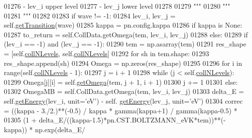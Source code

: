 \begin{DoxyCode}
{{01276 \textcolor{stringliteral}{            - lev\_i  upper level}
01277 \textcolor{stringliteral}{            - lev\_j  lower level}
01278 \textcolor{stringliteral}{}
01279 \textcolor{stringliteral}{        """}
01280         \textcolor{stringliteral}{"""}
01281 \textcolor{stringliteral}{        """}
01282         
01283         \textcolor{keywordflow}{if} wave != -1:
01284             lev\_i, lev\_j = self.\hyperlink{classpyneb_1_1core_1_1pynebcore_1_1_atom_a7c9f17a3d9e841267add92377d9d1ede}{getTransition}(wave)
01285         kappa = pn.config.kappa 
01286         \textcolor{keywordflow}{if} kappa \textcolor{keywordflow}{is} \textcolor{keywordtype}{None}:
01287             to\_return = self.CollData.getOmega(tem, lev\_i, lev\_j)
01288         \textcolor{keywordflow}{else}:
01289             \textcolor{keywordflow}{if} (lev\_i == -1) \textcolor{keywordflow}{and} (lev\_j == -1):
01290                 tem = np.asarray(tem)
01291                 res\_shape = [self.\hyperlink{classpyneb_1_1core_1_1pynebcore_1_1_atom_a8beaa0244d575054b3e2748a5e00d8db}{collNLevels}, self.\hyperlink{classpyneb_1_1core_1_1pynebcore_1_1_atom_a8beaa0244d575054b3e2748a5e00d8db}{collNLevels}]
01292                 \textcolor{keywordflow}{for} sh \textcolor{keywordflow}{in} tem.shape:
01293                     res\_shape.append(sh)
01294                 Omega = np.zeros(res\_shape)
01295         
01296                 \textcolor{keywordflow}{for} i \textcolor{keywordflow}{in} range(self.\hyperlink{classpyneb_1_1core_1_1pynebcore_1_1_atom_a8beaa0244d575054b3e2748a5e00d8db}{collNLevels} - 1):
01297                     j = i + 1
01298                     \textcolor{keywordflow}{while} (j < self.\hyperlink{classpyneb_1_1core_1_1pynebcore_1_1_atom_a8beaa0244d575054b3e2748a5e00d8db}{collNLevels}):
01299                         Omega[j][i] = self.\hyperlink{classpyneb_1_1core_1_1pynebcore_1_1_atom_ae133eed382e284df01f2183da341534b}{getOmega}(tem, j + 1, i + 1)
01300                         j += 1
01301             \textcolor{keywordflow}{else}:
01302                 OmegaMB = self.CollData.getOmega(tem, lev\_i, lev\_j)
01303                 delta\_E = self.\hyperlink{classpyneb_1_1core_1_1pynebcore_1_1_atom_a9940acb2999e864edf9761d822e65d7f}{getEnergy}(lev\_i, unit=\textcolor{stringliteral}{'eV'}) - self.
      \hyperlink{classpyneb_1_1core_1_1pynebcore_1_1_atom_a9940acb2999e864edf9761d822e65d7f}{getEnergy}(lev\_j, unit=\textcolor{stringliteral}{'eV'})
01304                 correc = ((kappa - 3./2.)**(-0.5) / kappa * gamma(kappa+1) / gamma(kappa-0.5) * 
01305                           (1 + delta\_E/((kappa-1.5)*pn.CST.BOLTZMANN\_eVK*tem))**(-kappa)) * np.exp(delta\_E/
}}
\end{DoxyCode}
